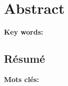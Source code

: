 \chapter*{Abstract}

\lipsum[1]

\vskip0.5cm
\textbf{Key words:} 
\Keywords


\cleardoublepage
\begin{otherlanguage}{french}
\chapter*{Résumé}

\lipsum[1]

\vskip0.5cm
\textbf{Mots clés:} 
\Keywordsfr
\end{otherlanguage}


